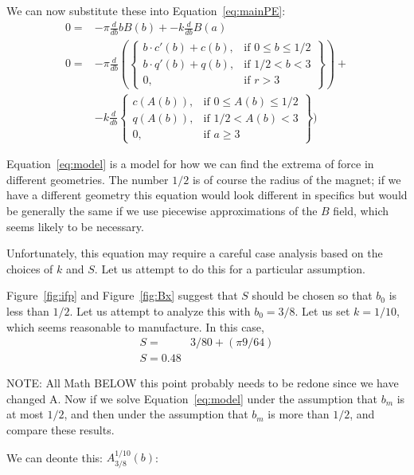 \documentclass[]{asme2ej}
\begin{document}
We can now substitute these into Equation~\ref{eq:mainPE}:
\begin{align}
    0 = & -  \pi  \frac{d}{db} b B(b) +  - k \frac{d}{db} B(a) \\
  0 = & - \pi \frac{d}{db} (
  \left\{
  \begin{array}{lr}
      b \cdot c'(b) + c(b) , & \text{if } 0 \leq b \leq 1/2 \\
      b \cdot q'(b) + q(b), & \text{if } 1/2 < b < 3 \\
      0  , & \text{if } r > 3
    \end{array}
  \right\}) +
  \\
  & - k \frac{d}{db}  \left\{
  \begin{array}{lr}
      c(A(b)) , & \text{if } 0 \leq A(b) \leq 1/2 \\
      q(A(b)) , & \text{if } 1/2 < A(b) < 3 \\
      0 , & \text{if } a \geq 3
  \end{array}
  \right\})
  \label{eq:model}
\end{align}

Equation~\ref{eq:model} is a model for how we can find the extrema of force in different geometries.
The number $1/2$ is of
course the radius of the magnet; if we have a different geometry this equation
would look different in specifics but would be generally the same if we use piecewise approximations
of the $B$ field, which seems likely to be necessary.

Unfortunately, this equation may require a careful case analysis based on the choices of $k$ and $S$.
Let us attempt to do this for a particular assumption.


Figure~\ref{fig:ifp} and Figure~\ref{fig:Bx} suggest that $S$ should be chosen so that $b_0$ is
less than $1/2$.
Let us attempt to analyze this with $b_0 = 3/8$. Let us set $k = 1/10$, which seems reasonable to manufacture.
In this case,
\begin{align}
  S = & 3/80 + (\pi 9/64) \\
  S = 0.48
\end{align}



NOTE: All Math BELOW this point probably needs to be redone since we have changed A.
Now if we solve Equation~\ref{eq:model} under the assumption that $b_m$ is at most $1/2$, and
then under the assumption that $b_m$ is more than $1/2$, and compare these results.

We can deonte this: $A_{3/8}^{1/10}(b)$:
\end{document}
